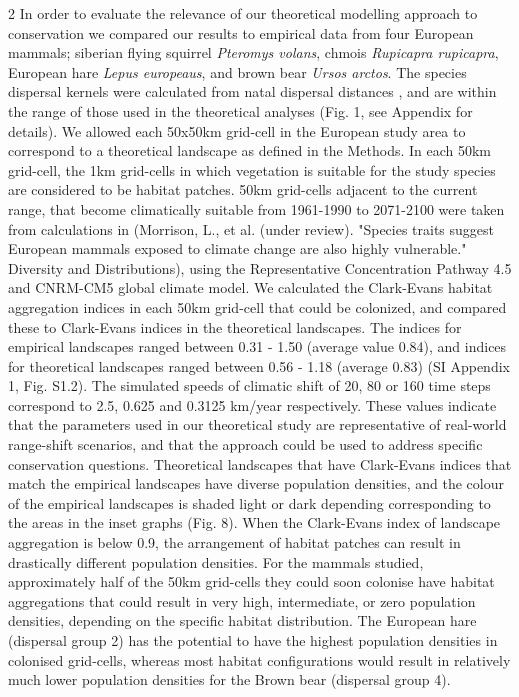 \documentclass[12pt,pdftex]{article}
\begin{document}
\begin{spacing}{2}
In order to evaluate the relevance of our theoretical modelling approach to conservation we compared our results to empirical data from four European mammals; siberian flying squirrel {\em Pteromys volans}, chmois {\em Rupicapra rupicapra}, European hare {\em Lepus europeaus}, and brown bear {\em Ursos arctos}.  The species dispersal kernels were calculated from natal dispersal distances \citep{Whitmee2013}, and are within the range of those used in the theoretical analyses  (Fig. 1, see Appendix for details).  We allowed each 50x50km grid-cell in the European study area to correspond to a theoretical landscape as defined in the Methods. In each 50km grid-cell, the 1km grid-cells in which vegetation is suitable for the study species are considered to be habitat patches. 50km grid-cells adjacent to the current range, that become climatically suitable from 1961-1990 to 2071-2100 were taken from calculations in (Morrison, L., et al. (under review). "Species traits suggest European mammals exposed to climate change are also highly vulnerable." Diversity and Distributions), using the Representative Concentration Pathway 4.5 and CNRM-CM5 global climate model.  We calculated the Clark-Evans habitat aggregation indices \citep{Clark1954} in each 50km grid-cell that could be colonized, and compared these to Clark-Evans indices in the theoretical landscapes. The indices for empirical landscapes ranged between 0.31 - 1.50 (average value 0.84), and indices for theoretical landscapes ranged between 0.56 - 1.18 (average 0.83) (SI Appendix 1, Fig. S1.2). The simulated speeds of climatic shift of 20, 80 or 160 time steps correspond to 2.5, 0.625 and 0.3125 km/year respectively.  These values indicate that the parameters used in our theoretical study are representative of real-world range-shift scenarios, and that the approach could be used to address specific conservation questions. Theoretical landscapes that have Clark-Evans indices that match the empirical landscapes have diverse population densities, and the colour of the empirical landscapes is shaded light or dark depending corresponding to the areas in the inset graphs (Fig. 8). When the Clark-Evans index of landscape aggregation is below 0.9, the arrangement of habitat patches can result in drastically different population densities.  For the mammals studied, approximately half of the 50km grid-cells they could soon colonise have habitat aggregations that could result in very high, intermediate, or zero population densities, depending on the specific habitat distribution. The European hare (dispersal group 2) has the potential to have the highest population densities in colonised grid-cells, whereas most habitat configurations would result in relatively much lower population densities for the Brown bear (dispersal group 4). 


\end{spacing}
\end{document}
